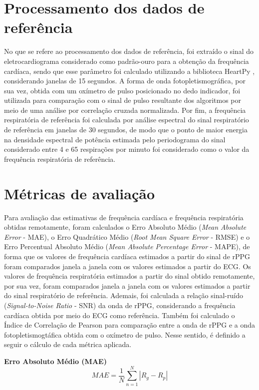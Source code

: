 \section{Processamento dos dados de referência}

No que se refere ao processamento dos dados de referência, foi extraído o sinal do eletrocardiograma considerado como padrão-ouro para a obtenção da frequência cardíaca, sendo que esse parâmetro foi calculado utilizando a biblioteca HeartPy \cite{heartpy}, considerando janelas de 15 segundos. A forma de onda fotopletismográfica, por sua vez, obtida com um oxímetro de pulso posicionado no dedo indicador, foi utilizada para comparação com o sinal de pulso resultante dos algoritmos por meio de uma análise por correlação cruzada normalizada. Por fim, a frequência respiratória de referência foi calculada por análise espectral do sinal respiratório de referência em janelas de 30 segundos, de modo que o ponto de maior energia na densidade espectral de potência estimada pelo periodograma do sinal considerado entre 4 e 65 respirações por minuto foi considerado como o valor da frequência respiratória de referência. 

\section{Métricas de avaliação}

Para avaliação das estimativas de frequência cardíaca e frequência respiratória obtidas remotamente, foram calculados o Erro Absoluto Médio (\textit{Mean Absolute Error} - MAE), o Erro Quadrático Médio (\textit{Root Mean Square Error} -  RMSE) e o Erro Percentual Absoluto Médio (\textit{Mean Absolute Percentage Error} - MAPE), de forma que os valores de frequência cardíaca estimados a partir do sinal de rPPG foram comparados janela a janela com os valores estimados a partir do ECG. Os valores de frequência respiratória estimados a partir do sinal obtido remotamente, por sua vez, foram comparados janela a janela com os valores estimados a partir do sinal respiratório de referência. Ademais, foi calculada a relação sinal-ruído (\textit{Signal-to-Noise Ratio} - SNR) da onda de rPPG, considerando a frequência cardíaca obtida por meio do ECG como referência. Também foi calculado o Índice de Correlação de Pearson para comparação entre a onda de rPPG e a onda fotopletismogtáfica obtida com o oxímetro de pulso.  Nesse sentido, é definido a seguir o cálculo de cada métrica aplicada.

\textbf{Erro Absoluto Médio (MAE)} 
\begin{equation}
    MAE = \frac{1}{N} \sum_{n=1}^{N} \left| R_g - R_p \right|
\end{equation}

